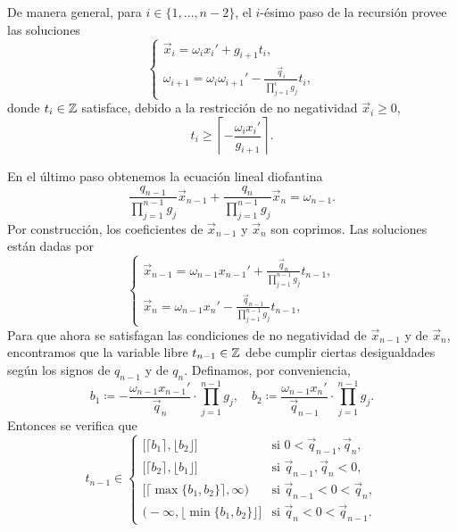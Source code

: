 De manera general, para $i \in \lbrace 1, \ldots, n - 2 \rbrace$, el $i$-ésimo paso de la recursión
provee las soluciones
\begin{equation}
	\label{eq:recurrence}
	\begin{cases}
		\vec{x}_i = \omega_ix_i' + g_{i + 1}t_i, \\
		\omega_{i + 1} = \omega_i\omega_{i + 1}' - \frac{\vec{q}_i}{\prod_{j=1}^{i}g_j}t_i,
	\end{cases}
\end{equation}
donde $t_i \in \mathbb{Z}$ satisface, debido a la restricción de no negatividad $\vec{x}_i \geq 0$,
\begin{equation}
	\label{eq:param-lb}
	t_i \geq \left\lceil -\frac{\omega_ix_i'}{g_{i + 1}} \right\rceil.
\end{equation}

En el último paso obtenemos la ecuación lineal diofantina
\begin{equation}
	\label{eq:last-equation}
	\frac{q_{n-1}}{\prod_{j=1}^{n-1}g_j}\vec{x}_{n-1} +
	\frac{q_{n}}{\prod_{j=1}^{n-1}g_j}\vec{x}_n
	= \omega_{n-1}.
\end{equation}
Por construcción, los coeficientes de $\vec{x}_{n - 1}$ y $\vec{x}_n$ son coprimos. Las soluciones
están dadas por
\begin{equation}
	\label{eq:last-solution}
	\begin{cases}
		\vec{x}_{n-1} = \omega_{n-1}x_{n-1}' + \frac{\vec{q}_n}{\prod_{j=1}^{n-1}g_j}t_{n-1}, \\
		\vec{x}_n = \omega_{n-1}x_n' - \frac{\vec{q}_{n-1}}{\prod_{j=1}^{n-1}g_j}t_{n-1},
	\end{cases}
\end{equation}
Para que ahora se satisfagan las condiciones de no negatividad de $\vec{x}_{n-1}$ y de $\vec{x}_n$,
encontramos que la variable libre $t_{n-1} \in \mathbb{Z}$ debe cumplir ciertas desigualdades según los
signos de $q_{n-1}$ y de $q_n$. Definamos, por conveniencia,
\begin{equation*}
	b_1 \coloneq -\frac{\omega_{n-1}x_{n-1}'}{\vec{q}_n} \cdot \prod_{j=1}^{n-1}g_j,
	\quad b_2 \coloneq \frac{\omega_{n-1}x_{n}'}{\vec{q}_{n-1}} \cdot \prod_{j=1}^{n-1}g_j.
\end{equation*}
Entonces se verifica que
\begin{equation}
	\label{eq:feasible-param}
	t_{n-1} \in 
	\begin{cases}
		\big[ \lceil b_1 \rceil, \lfloor b_2 \rfloor \big] & \text{si } 0 < \vec{q}_{n-1}, \vec{q}_n, \\
		\big[ \lceil b_2 \rceil, \lfloor b_1 \rfloor \big] & \text{si } \vec{q}_{n-1}, \vec{q}_n < 0, \\
		\big[ \lceil \max\lbrace b_1 ,  b_2 \rbrace \rceil, \infty \big) & \text{si } \vec{q}_{n-1}
		< 0 < \vec{q}_n, \\
		\big( -\infty, \lfloor \min\lbrace b_1, b_2\rbrace \rfloor \big] & \text{si } \vec{q}_n < 0
		< \vec{q}_{n-1}.
	\end{cases}
\end{equation}

